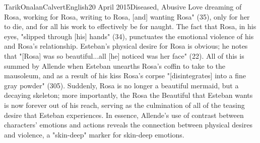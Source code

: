 \documentclass[12pt,a4paper]{article}
\begin{document}
\begin{mla}{Tarik}{Onalan}{Calvert}{English}{20 April 2015}{Diseased, Abusive Love}
            dreaming of Rosa, working for Rosa, writing to Rosa, [and] wanting Rosa"
            (35), only for her to die, and for all his work to effectively be for
            naught. The fact that Rosa, in his eyes, "slipped through [his] hands"
            (34), punctuates the emotional violence of his and Rosa's relationship.
            Esteban's physical desire for Rosa is obvious; he notes that "[Rosa]
            was so beautiful...all [he] noticed was her face" (22). All of this
            is summed by Allende when Esteban unearths Rosa's coffin to take to
            the mausoleum, and as a result of his kiss Rosa's corpse "[disintegrates]
            into a fine gray powder" (305). Suddenly, Rosa is no longer a beautiful
            mermaid, but a decaying skeleton; more importantly, the Rosa the Beautiful
            that Esteban wants is now forever out of his reach, serving as the
            culmination of all of the teasing desire that Esteban experiences.
            In essence, Allende's use of contrast between characters' emotions
            and actions reveals the connection between physical desires and
            violence, a "skin-deep" marker for skin-deep emotions.
    \end{mla}
\end{document}
